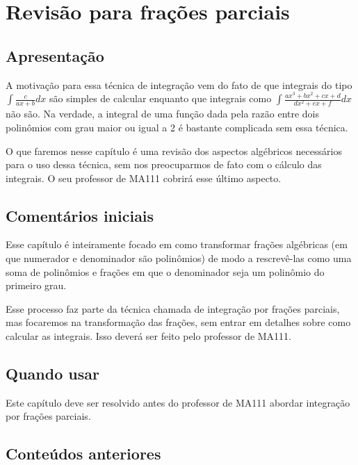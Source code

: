 \documentclass[main_estudante.tex]{subfiles}
\begin{document}
\paraAmbos

\chapter{Revisão para frações parciais}

\section{Apresentação}

A motivação para essa técnica de integração vem do fato de que integrais do tipo $\int \frac{c}{ax+b} dx$ são simples de calcular enquanto que integrais como $\int \frac{ax^3+bx^2+cx+d}{dx^2+ex+f} dx$ não são. Na verdade, a integral de uma função dada pela razão entre dois polinômios com grau maior ou igual a 2 é bastante complicada sem essa técnica.

O que faremos nesse capítulo é uma revisão dos aspectos algébricos necessários para o uso dessa técnica, sem nos preocuparmos de fato com o cálculo das integrais. O seu professor de MA111 cobrirá esse último aspecto.

\paraTutores

\section{Comentários iniciais}

Esse capítulo é inteiramente focado em como transformar frações algébricas (em que numerador e denominador são polinômios) de modo a rescrevê-las como uma soma de polinômios e frações em que o denominador seja um polinômio do primeiro grau.

Esse processo faz parte da técnica chamada de integração por frações parciais, mas focaremos na transformação das frações, sem entrar em detalhes sobre como calcular as integrais. Isso deverá ser feito pelo professor de MA111.

\paraAmbos

\section{Quando usar}

Este capítulo deve ser resolvido antes do professor de MA111 abordar integração por frações parciais.

\section{Conteúdos anteriores}
\end{document}
